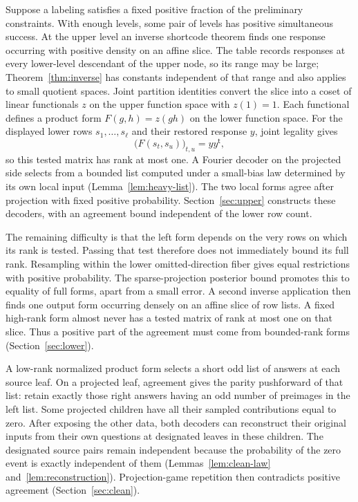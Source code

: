 Suppose a labeling satisfies a fixed positive fraction of the preliminary
constraints.  With enough levels, some pair of levels has positive
simultaneous success.  At the upper level an inverse shortcode theorem
finds one response occurring with positive density on an affine slice.
The table records responses at every lower-level descendant of the upper
node, so its range may be large;
Theorem~\ref{thm:inverse} has constants independent of that range and also
applies to small quotient spaces.  Joint partition identities convert the
slice into a coset of linear functionals $z$ on the upper function space
with $z(1)=1$.  Each functional
defines a product form $F(g,h)=z(gh)$ on the lower function space.
For the displayed lower rows $s_1,\ldots,s_\ell$ and their restored
response $y$, joint legality gives
\[
                   \bigl(F(s_t,s_u)\bigr)_{t,u}=yy^{\mathsf t},
\]
so this tested matrix has rank at most one.  A Fourier decoder on the
projected side selects from a bounded list computed under a small-bias
law determined by its own local input (Lemma~\ref{lem:heavy-list}).
The two local forms agree after projection with fixed positive probability.
Section~\ref{sec:upper} constructs these decoders, with an agreement bound
independent of the lower row count.

The remaining difficulty is that the left form depends on the very rows
on which its rank is tested.  Passing that test therefore does not
immediately bound its full rank.  Resampling within the lower omitted-direction
fiber gives equal restrictions with positive probability.  The sparse-projection
posterior bound promotes this to equality of full forms, apart from a small
error.  A second inverse application then finds one output form occurring densely
on an affine slice of row lists.  A fixed high-rank form almost never has a tested
matrix of rank at most one on that slice.  Thus a positive part of the
agreement must come from bounded-rank forms (Section~\ref{sec:lower}).

A low-rank normalized product form selects a short odd list of answers at
each source leaf.  On a projected leaf, agreement gives the parity
pushforward of that list: retain exactly those right answers having an
odd number of preimages in the left list.  Some projected children have
all their sampled contributions equal to zero.  After exposing the other
data, both decoders can reconstruct their original inputs from their own
questions at designated leaves in these children.  The designated source
pairs remain independent because the probability of the zero event is
exactly independent of them (Lemmas~\ref{lem:clean-law}
and~\ref{lem:reconstruction}).  Projection-game repetition then contradicts
positive agreement (Section~\ref{sec:clean}).

